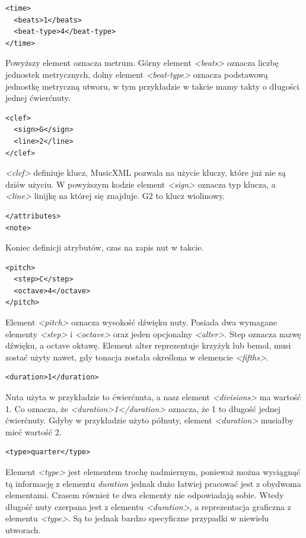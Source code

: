 \documentclass[printmode, eng, openany]{mgr}
\begin{document}
\begin{lstlisting}
<time>
  <beats>1</beats>
  <beat-type>4</beat-type>
</time>
\end{lstlisting}
Powyższy element oznacza metrum. Górny element \textit{<beats>} oznacza liczbę jednostek metrycznych, dolny element \textit{<beat-type>} oznacza podstawową jednostkę metryczną utworu, w tym przykładzie w takcie mamy takty o długości jednej ćwierćnuty.

\begin{lstlisting}
<clef>
  <sign>G</sign>
  <line>2</line>
</clef>
\end{lstlisting}
\textit{<clef>} definiuje klucz, MusicXML pozwala na użycie kluczy, które już nie są dziś\linebreak w użyciu. W powyższym kodzie element \textit{<sign>} oznacza typ klucza, a \textit{<line>} linijkę na której się znajduje. G2 to klucz wiolinowy.

\begin{lstlisting}
</attributes>
<note>
\end{lstlisting}
Koniec definicji atrybutów, czas na zapis nut w takcie.

\begin{lstlisting}
<pitch>
  <step>C</step>
  <octave>4</octave>
</pitch>
\end{lstlisting}
Element \textit{<pitch>} oznacza wysokość dźwięku nuty. Posiada dwa wymagane elementy \textit{<step>} i \textit{<octave>} oraz jeden opcjonalny \textit{<alter>}. Step oznacza nazwę dźwięku, a octave oktawę. Element alter reprezentuje krzyżyk lub bemol, musi zostać użyty nawet, gdy  tonacja została określona w elemencie \textit{<fifths>}.

\begin{lstlisting}
<duration>1</duration>
\end{lstlisting}
Nuta użyta w przykładzie to ćwierćnuta, a nasz element \textit{<divisions>} ma wartość 1. Co oznacza, że \textit{<duration>1</duration>} oznacza, że 1 to długość jednej ćwierćnuty. Gdyby w przykładzie użyto półnuty, element \textit{<duration>} musiałby mieć wartość 2.

\begin{lstlisting}
<type>quarter</type>
\end{lstlisting}
Element \textit{<type>} jest elementem trochę nadmiernym, ponieważ można wyciągnąć tą informację z elementu \textit{duration} jednak dużo łatwiej pracować jest z obydwoma elementami. Czasem również te dwa elementy nie odpowiadają sobie. Wtedy długość nuty czerpana jest z elementu \textit{<duration>}, a reprezentacja graficzna z elementu \textit{<type>}. Są to jednak bardzo specyficzne przypadki w niewielu utworach.
\end{document}
